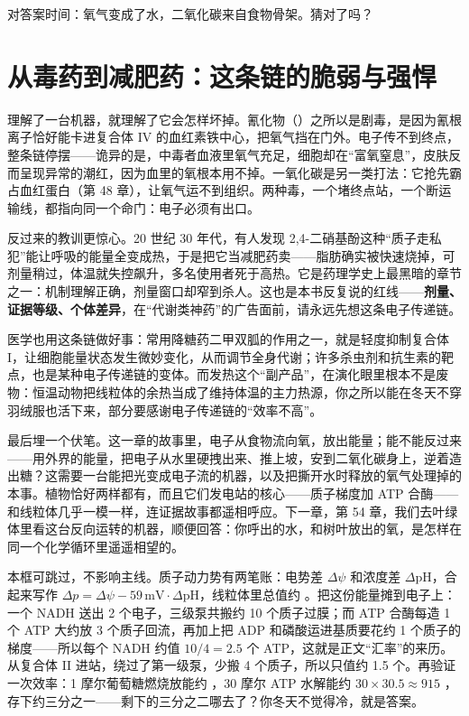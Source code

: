 对答案时间：氧气变成了水，二氧化碳来自食物骨架。猜对了吗？

\section{从毒药到减肥药：这条链的脆弱与强悍}

理解了一台机器，就理解了它会怎样坏掉。氰化物（）之所以是剧毒，是因为氰根离子恰好能卡进复合体 IV 的血红素铁中心，把氧气挡在门外。电子传不到终点，整条链停摆——诡异的是，中毒者血液里氧气充足，细胞却在“富氧窒息”，皮肤反而呈现异常的潮红，因为血里的氧根本用不掉。一氧化碳是另一类打法：它抢先霸占血红蛋白（第 48 章），让氧气运不到组织。两种毒，一个堵终点站，一个断运输线，都指向同一个命门：电子必须有出口。

反过来的教训更惊心。20 世纪 30 年代，有人发现 2,4-二硝基酚这种“质子走私犯”能让呼吸的能量全变成热，于是把它当减肥药卖——脂肪确实被快速烧掉，可剂量稍过，体温就失控飙升，多名使用者死于高热。它是药理学史上最黑暗的章节之一：机制理解正确，剂量窗口却窄到杀人。这也是本书反复说的红线——\textbf{剂量、证据等级、个体差异}，在“代谢类神药”的广告面前，请永远先想这条电子传递链。

医学也用这条链做好事：常用降糖药二甲双胍的作用之一，就是轻度抑制复合体 I，让细胞能量状态发生微妙变化，从而调节全身代谢；许多杀虫剂和抗生素的靶点，也是某种电子传递链的变体。而发热这个“副产品”，在演化眼里根本不是废物：恒温动物把线粒体的余热当成了维持体温的主力热源，你之所以能在冬天不穿羽绒服也活下来，部分要感谢电子传递链的“效率不高”。

最后埋一个伏笔。这一章的故事里，电子从食物流向氧，放出能量；能不能反过来——用外界的能量，把电子从水里硬拽出来、推上坡，安到二氧化碳身上，逆着造出糖？这需要一台能把光变成电子流的机器，以及把撕开水时释放的氧气处理掉的本事。植物恰好两样都有，而且它们发电站的核心——质子梯度加 ATP 合酶——和线粒体几乎一模一样，连证据故事都遥相呼应。下一章，第 54 章，我们去叶绿体里看这台反向运转的机器，顺便回答：你呼出的水，和树叶放出的氧，是怎样在同一个化学循环里遥遥相望的。

\begin{tiaozhan}
本框可跳过，不影响主线。质子动力势有两笔账：电势差 $\Delta\psi$ 和浓度差 $\Delta\mathrm{pH}$，合起来写作 $\Delta p = \Delta\psi - 59\,\mathrm{mV}\cdot\Delta\mathrm{pH}$，线粒体里总值约 。把这份能量摊到电子上：一个 NADH 送出 2 个电子，三级泵共搬约 10 个质子过膜；而 ATP 合酶每造 1 个 ATP 大约放 3 个质子回流，再加上把 ADP 和磷酸运进基质要花约 1 个质子的梯度——所以每个 NADH 约值 $10/4 = 2.5$ 个 ATP，这就是正文“汇率”的来历。 从复合体 II 进站，绕过了第一级泵，少搬 4 个质子，所以只值约 1.5 个。再验证一次效率：1 摩尔葡萄糖燃烧放能约 ，30 摩尔 ATP 水解能约 $30\times 30.5 \approx 915$ ，存下约三分之一——剩下的三分之二哪去了？你冬天不觉得冷，就是答案。
\end{tiaozhan}

